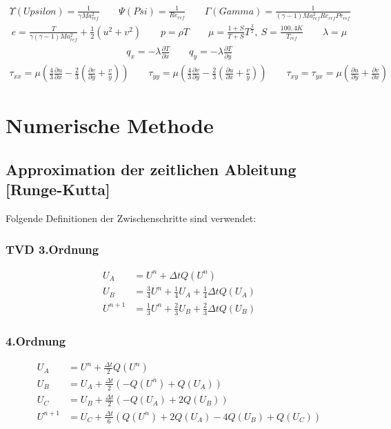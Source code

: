 \begin{align*}
\Upsilon (Upsilon)=\frac{1}{\gamma Ma_{ref}^2}
\ \ \ \ \ \ \ \ \ 
\Psi (Psi)=\frac{1}{Re_{ref}}
\ \ \ \ \ \ \ \ \ 
\Gamma (Gamma)=\frac{1}{\left(\gamma -1 \right)Ma_{ref}^2 Re_{ref} Pr_{ref}}
\end{align*}
\begin{align*}
e=\frac{T}{\gamma \left(\gamma -1\right)Ma_{ref}^2}+\frac{1}{2}\left(u^2+v^2\right)
\ \ \ \ \ \ \ \ \ 
p=\rho T
\ \ \ \ \ \ \ \ \ 
\mu=\frac{1+S}{T+S}T^\frac{3}{2},\ S=\frac{100,4K}{{T_{ref}}}
\ \ \ \ \ \ \ \ \ 
\lambda=\mu
\end{align*}
\begin{align*}
q_x=-\lambda \frac{\partial T}{\partial x}
\ \ \ \ \ \ \ \ \ 
q_y=-\lambda \frac{\partial T}{\partial y}
\end{align*}
\begin{align*}
\tau_{xx}=\mu \left(\frac{4}{3}\frac{\partial u}{\partial x}-\frac{2}{3}\left(\frac{\partial v}{\partial y} +\frac{v}{y}\right)\right)
\ \ \ \ \ \ \ \ \
\tau_{yy}=\mu \left(\frac{4}{3}\frac{\partial v}{\partial y}-\frac{2}{3}\left(\frac{\partial u}{\partial x} +\frac{v}{y}\right)\right)
\ \ \ \ \ \ \ \ \ 
\tau_{xy}=\tau_{yx}=\mu \left(\frac{\partial u}{\partial y}+\frac{\partial v}{\partial x} \right)
\end{align*}


\section{Numerische Methode}
\subsection{Approximation der zeitlichen Ableitung [Runge-Kutta]}
Folgende Definitionen der Zwischenschritte sind verwendet:
\subsubsection{TVD 3.Ordnung}
\begin{align*}
U_{A}&=U^{n}+\varDelta t Q\left(U^{n}\right)
\\
U_{B}&=\frac{3}{4}U^{n}+\frac{1}{4}U_A+\frac{1}{4}\varDelta t Q\left(U_{A}\right)
\\
U^{n+1}&=\frac{1}{3}U^{n}+\frac{2}{3}U_B+\frac{2}{3}\varDelta t Q\left(U_{B}\right)
\end{align*}


\subsubsection{4.Ordnung}
\begin{align*}
U_{A}&=U^{n}+ \frac{\varDelta t}{2} Q\left(U^{n}\right)
\\
U_{B}&=U_{A}+ \frac{\varDelta t}{2} \left(-Q\left(U^{n}\right)+Q\left(U_{A}\right)\right)
\\
U_{C}&=U_{B}+ \frac{\varDelta t}{2} \left(-Q\left(U_{A}\right)+2Q\left(U_{B}\right)\right)
\\
U^{n+1}&=U_{C}+\frac{\varDelta t}{6} \left(Q\left(U^{n}\right)+2Q\left(U_{A}\right)-4Q\left(U_{B}\right)+Q\left(U_{C}\right)\right)
\end{align*}


